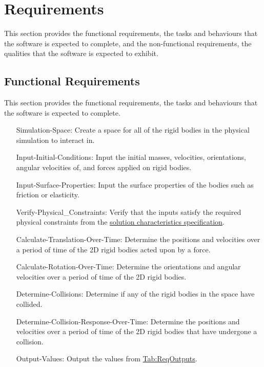 \documentclass[12pt]{article}
\begin{document}
\section{Requirements}
\label{Sec:Requirements}
This section provides the functional requirements, the tasks and behaviours that the software is expected to complete, and the non-functional requirements, the qualities that the software is expected to exhibit.

\subsection{Functional Requirements}
\label{Sec:FRs}
This section provides the functional requirements, the tasks and behaviours that the software is expected to complete.

\begin{itemize}
\item[Simulation-Space:\phantomsection\label{simSpace}]{Create a space for all of the rigid bodies in the physical simulation to interact in.}
\item[Input-Initial-Conditions:\phantomsection\label{inputInitialConds}]{Input the initial masses, velocities, orientations, angular velocities of, and forces applied on rigid bodies.}
\item[Input-Surface-Properties:\phantomsection\label{inputSurfaceProps}]{Input the surface properties of the bodies such as friction or elasticity.}
\item[Verify-Physical\_Constraints:\phantomsection\label{verifyPhysCons}]{Verify that the inputs satisfy the required physical constraints from the \hyperref[Sec:SolCharSpec]{solution characteristics specification}.}
\item[Calculate-Translation-Over-Time:\phantomsection\label{calcTransOverTime}]{Determine the positions and velocities over a period of time of the 2D rigid bodies acted upon by a force.}
\item[Calculate-Rotation-Over-Time:\phantomsection\label{calcRotOverTime}]{Determine the orientations and angular velocities over a period of time of the 2D rigid bodies.}
\item[Determine-Collisions:\phantomsection\label{deterColls}]{Determine if any of the rigid bodies in the space have collided.}
\item[Determine-Collision-Response-Over-Time:\phantomsection\label{deterCollRespOverTime}]{Determine the positions and velocities over a period of time of the 2D rigid bodies that have undergone a collision.}
\item[Output-Values:\phantomsection\label{outputValues}]{Output the values from \hyperref[Table:ReqOutputs]{Tab:ReqOutputs}.}
\end{itemize}
\end{document}
